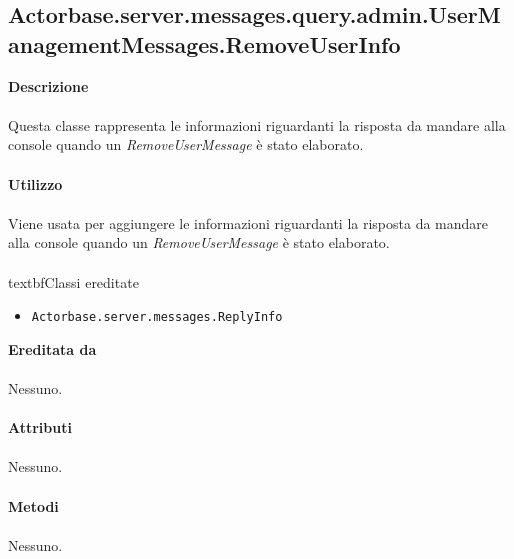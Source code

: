 \documentclass[a4paper]{article}
\begin{document}
	\subsection{Actorbase.server.messages.query.admin.UserManagementMessages.RemoveUserInfo}
		\textbf{Descrizione}
			\\ \\
			Questa classe rappresenta le informazioni riguardanti la risposta da mandare alla console quando un \emph{RemoveUserMessage} è stato elaborato.
			\\ \\
		\textbf{Utilizzo}
			\\ \\
			Viene usata per aggiungere le informazioni riguardanti la risposta da mandare alla console quando un \emph{RemoveUserMessage} è stato elaborato.
			\\ \\
		textbf{Classi ereditate}
			\begin{itemize}
				\item \texttt{Actorbase.server.messages.ReplyInfo}
			\end{itemize}
		\textbf{Ereditata da}
			\\ \\
			Nessuno.
			\\ \\
		\textbf{Attributi}
			\\ \\
			Nessuno.
			\\ \\
		\textbf{Metodi}
			\\ \\
			Nessuno.

		
\end{document}
